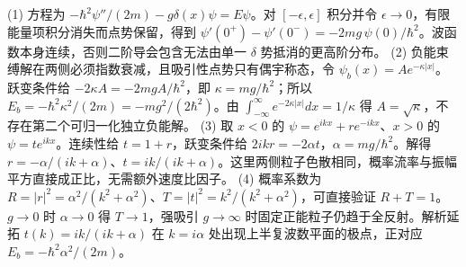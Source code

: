 (1) 方程为 \(-\hbar^2\psi''/(2m)-g\delta(x)\psi=E\psi\)。对 \([-\epsilon,\epsilon]\) 积分并令 \(\epsilon\to0\)，有限能量项积分消失而点势保留，得到 \(\psi'(0^+)-\psi'(0^-)=-2mg\,\psi(0)/\hbar^2\)。波函数本身连续，否则二阶导会包含无法由单一 \(\delta\) 势抵消的更高阶分布。
(2) 负能束缚解在两侧必须指数衰减，且吸引性点势只有偶宇称态，令 \(\psi_b(x)=A e^{-\kappa|x|}\)。跃变条件给 \(-2\kappa A=-2mgA/\hbar^2\)，即 \(\kappa=mg/\hbar^2\)；所以 \(E_b=-\hbar^2\kappa^2/(2m)=-mg^2/(2\hbar^2)\)。由 \(\int_{-\infty}^{\infty}e^{-2\kappa|x|}dx=1/\kappa\) 得 \(A=\sqrt\kappa\)，不存在第二个可归一化独立负能解。
(3) 取 \(x<0\) 的 \(\psi=e^{ikx}+r e^{-ikx}\)、\(x>0\) 的 \(\psi=t e^{ikx}\)。连续性给 \(t=1+r\)，跃变条件给 \(2ik r=-2\alpha t\)，\(\alpha=mg/\hbar^2\)。解得 \(r=-\alpha/(ik+\alpha)\)、\(t=ik/(ik+\alpha)\)。这里两侧粒子色散相同，概率流率与振幅平方直接成正比，无需额外速度比因子。
(4) 概率系数为 \(R=|r|^2=\alpha^2/(k^2+\alpha^2)\)、\(T=|t|^2=k^2/(k^2+\alpha^2)\)，可直接验证 \(R+T=1\)。\(g\to0\) 时 \(\alpha\to0\) 得 \(T\to1\)，强吸引 \(g\to\infty\) 时固定正能粒子仍趋于全反射。解析延拓 \(t(k)=ik/(ik+\alpha)\) 在 \(k=i\alpha\) 处出现上半复波数平面的极点，正对应 \(E_b=-\hbar^2\alpha^2/(2m)\)。
